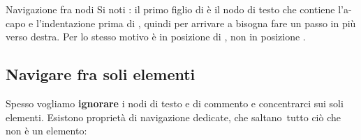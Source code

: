 \begin{esempio}{Navigazione fra nodi}
Si noti : il primo figlio di  è il nodo
di testo che contiene l'a-capo e l'indentazione prima di , quindi per
arrivare a  bisogna fare un passo in più verso destra. Per lo stesso
motivo  è in posizione \code{[1]} di , non in
posizione \code{[0]}.
\end{esempio}

\subsection{Navigare fra soli elementi}

Spesso vogliamo \textbf{ignorare} i nodi di testo e di commento e concentrarci
sui soli elementi. Esistono proprietà di navigazione dedicate, che
\guillemotleft saltano\guillemotright\ tutto ciò che non è un elemento:

